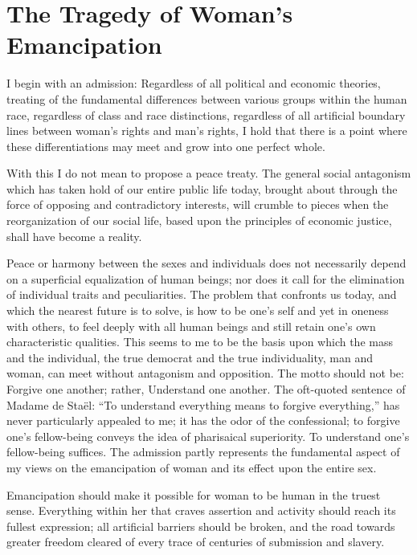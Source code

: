 
\author{Emma Goldman}
\chapter{The Tragedy of Woman's Emancipation}


I begin with an admission: Regardless of all political and
economic theories, treating of the fundamental differences between
various groups within the human race, regardless of class and race
distinctions, regardless of all artificial boundary lines between
woman's rights and man's rights, I hold that there is a point where
these differentiations may meet and grow into one perfect whole.

With this I do not mean to propose a peace treaty. The general social
antagonism which has taken hold of our entire public life today,
brought about through the force of opposing and contradictory
interests, will crumble to pieces when the reorganization of our
social life, based upon the principles of economic justice, shall have
become a reality.

Peace or harmony between the sexes and individuals does not
necessarily depend on a superficial equalization of human beings; nor
does it call for the elimination of individual traits and
peculiarities. The problem that confronts us today, and which the
nearest future is to solve, is how to be one's self and yet 
in oneness with others, to feel deeply with all human beings and still
retain one's own characteristic qualities. This seems to me to be the
basis upon which the mass and the individual, the true democrat and
the true individuality, man and woman, can meet without antagonism and
opposition. The motto should not be: Forgive one another; rather,
Understand one another. The oft-quoted sentence of Madame de
Sta\"{e}l:  ``To understand everything means to forgive everything,''
has never particularly appealed to me; it has the odor of the
confessional; to forgive one's fellow-being conveys the idea of
pharisaical superiority. To understand one's fellow-being suffices.
The admission partly represents the fundamental aspect of my views on
the emancipation of woman and its effect upon the entire sex.

Emancipation should make it possible for woman to be human in the
truest sense. Everything within her that craves assertion and activity
should reach its fullest expression; all artificial barriers should be
broken, and the road towards greater freedom cleared of every trace of
centuries of submission and slavery.

